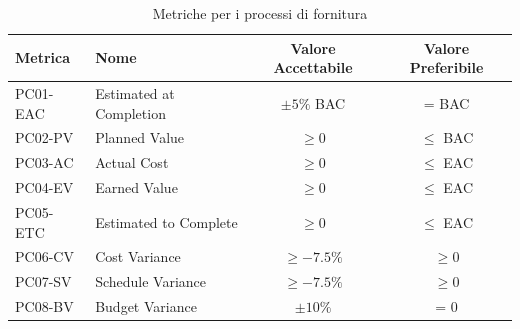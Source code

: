 \documentclass[a4paper,10pt]{article}
\begin{document}
\begin{table}[H]
\centering
\renewcommand{\arraystretch}{1.2}
\begin{tabular}{|l|l|c|c|}
\hline
\textbf{Metrica} & \textbf{Nome} & \textbf{Valore Accettabile} & \textbf{Valore Preferibile} \\
\hline
PC01-EAC & Estimated at Completion & $\pm 5\%$ BAC & = BAC \\
PC02-PV  & Planned Value           & $\geq 0$      & $\leq$ BAC \\
PC03-AC  & Actual Cost             & $\geq 0$      & $\leq$ EAC \\
PC04-EV  & Earned Value             & $\geq 0$      & $\leq$ EAC \\
PC05-ETC & Estimated to Complete    & $\geq 0$      & $\leq$ EAC \\
PC06-CV  & Cost Variance            & $\geq -7.5\%$ & $\geq 0$ \\
PC07-SV  & Schedule Variance        & $\geq -7.5\%$ & $\geq 0$ \\
PC08-BV  & Budget Variance          & $\pm 10\%$    & = 0 \\
\hline
\end{tabular}
\caption{Metriche per i processi di fornitura}
\label{tab:metriche-fornitura}
\end{table}
\end{document}

